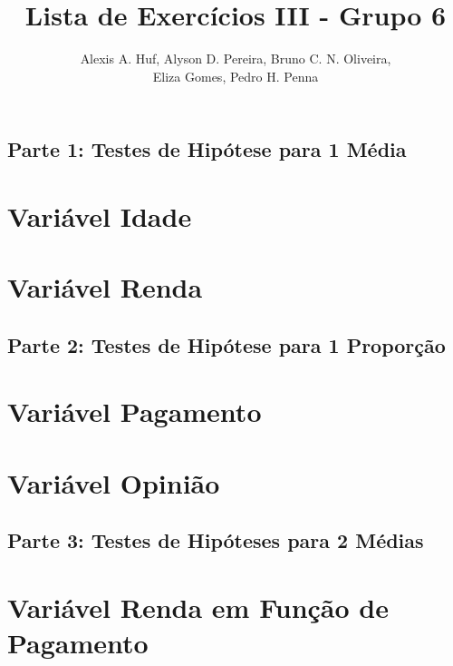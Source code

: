 \documentclass[10pt,a4paper,oneside]{article}
\author{%
	Alexis A. Huf, %
	Alyson D. Pereira, %
	Bruno C. N. Oliveira,\\%
	Eliza Gomes, %
	Pedro H. Penna
	}
\title{Lista de Exercícios III - Grupo 6}
\begin{document}
\maketitle

\begin{center}
	\section*{Parte 1: Testes de Hipótese para 1 Média}
\end{center}
\section{Variável Idade}
\label{questao:1}


\section{Variável Renda}
\label{questao:2}


\begin{center}
	\section*{Parte 2: Testes de Hipótese para 1 Proporção}
\end{center}

\section{Variável Pagamento}
\label{questao:3}


\section{Variável Opinião}
\label{questao:4}



\begin{center}
	\section*{Parte 3: Testes de Hipóteses para 2 Médias}
\end{center}

\section{Variável Renda em Função de Pagamento}
\label{questao:5}

\end{document}
